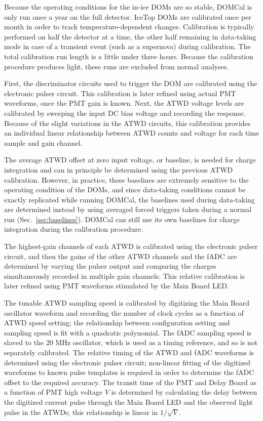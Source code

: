 Because the operating conditions for
the in-ice DOMs are so stable, DOMCal is only run once a year on the full
detector. IceTop DOMs are calibrated once per month in order to track
temperature-dependent changes.  Calibration is
typically performed on half the detector at a time, the other half
remaining in data-taking mode in case of a transient event (such as a
supernova) during calibration. The total calibration run length is a
little under three hours. Because the calibration procedure produces
light, these runs are excluded from normal analyses.

First, the discriminator circuits used to trigger the DOM are calibrated
using the electronic pulser circuit.  This calibration is later refined using actual
PMT waveforms, once the PMT gain is known.  Next, the ATWD voltage levels
are calibrated by sweeping the input DC bias voltage and recording the
response.  Because of the slight variations in the ATWD circuits, this
calibration provides an individual linear relationship between ATWD counts
and voltage for each time sample and gain channel.

The average ATWD offset at zero input voltage, or baseline, is needed for
charge integration and can in principle be determined using the previous
ATWD calibration. However, in
practice, these baselines are extremely sensitive to the operating
condition of the DOMs, and since data-taking conditions cannot be exactly
replicated while running DOMCal, the baselines used during data-taking are
determined instead by using averaged forced triggers taken during a normal
run (Sec.~\ref{sec:baselines}).  DOMCal can still use its own
baselines for charge integration during the calibration procedure.

The highest-gain channels of each ATWD is calibrated using the electronic
pulser circuit, and then the gains of the other ATWD channels and the fADC
are determined by varying the pulser output and comparing the charges
simultaneously recorded in multiple gain channels.  This relative
calibration is later refined using PMT waveforms stimulated by the Main
Board LED.

The tunable ATWD sampling speed is calibrated by digitizing the Main Board oscillator
waveform and recording the number of clock cycles as a function of ATWD
speed setting; the relationship between configuration setting and sampling
speed is fit with a quadratic polynomial.  The fADC sampling speed is
slaved to the 20 MHz oscillator, which is used as a timing reference, and
so is not separately calibrated.  The relative timing of 
the ATWD and fADC waveforms is determined using the electronic pulser circuit;
non-linear fitting of the digitized waveforms to known pulse templates is
required in order to determine the fADC offset to the required accuracy.
The transit time of the PMT and Delay Board as a function of PMT high
voltage $V$ is determined by calculating the delay between the digitized
current pulse through the Main Board LED and the observed light pulse in
the ATWDs; this relationship is linear in $1/\sqrt{V}$.

